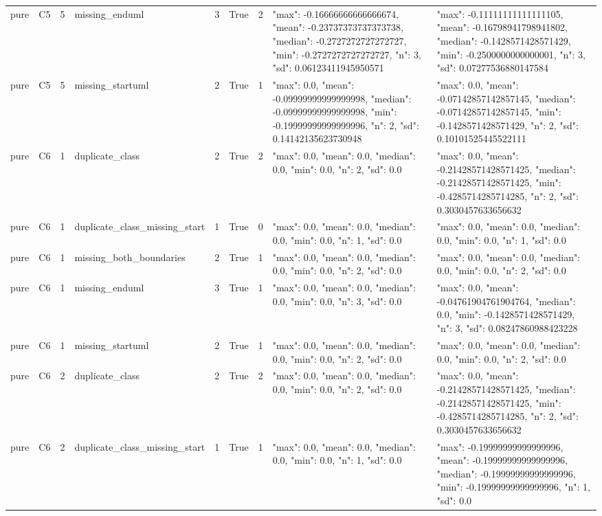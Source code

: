 \begin{tabular}{lllllllll}
pure & C5 & 5 & missing\_enduml & 3 & True & 2 & {"max": -0.16666666666666674, "mean": -0.23737373737373738, "median": -0.2727272727272727, "min": -0.2727272727272727, "n": 3, "sd": 0.06123411945950571} & {"max": -0.11111111111111105, "mean": -0.16798941798941802, "median": -0.1428571428571429, "min": -0.2500000000000001, "n": 3, "sd": 0.07277536880147584} \\
pure & C5 & 5 & missing\_startuml & 2 & True & 1 & {"max": 0.0, "mean": -0.09999999999999998, "median": -0.09999999999999998, "min": -0.19999999999999996, "n": 2, "sd": 0.14142135623730948} & {"max": 0.0, "mean": -0.07142857142857145, "median": -0.07142857142857145, "min": -0.1428571428571429, "n": 2, "sd": 0.10101525445522111} \\
pure & C6 & 1 & duplicate\_class & 2 & True & 2 & {"max": 0.0, "mean": 0.0, "median": 0.0, "min": 0.0, "n": 2, "sd": 0.0} & {"max": 0.0, "mean": -0.21428571428571425, "median": -0.21428571428571425, "min": -0.4285714285714285, "n": 2, "sd": 0.3030457633656632} \\
pure & C6 & 1 & duplicate\_class\_missing\_start & 1 & True & 0 & {"max": 0.0, "mean": 0.0, "median": 0.0, "min": 0.0, "n": 1, "sd": 0.0} & {"max": 0.0, "mean": 0.0, "median": 0.0, "min": 0.0, "n": 1, "sd": 0.0} \\
pure & C6 & 1 & missing\_both\_boundaries & 2 & True & 1 & {"max": 0.0, "mean": 0.0, "median": 0.0, "min": 0.0, "n": 2, "sd": 0.0} & {"max": 0.0, "mean": 0.0, "median": 0.0, "min": 0.0, "n": 2, "sd": 0.0} \\
pure & C6 & 1 & missing\_enduml & 3 & True & 1 & {"max": 0.0, "mean": 0.0, "median": 0.0, "min": 0.0, "n": 3, "sd": 0.0} & {"max": 0.0, "mean": -0.04761904761904764, "median": 0.0, "min": -0.1428571428571429, "n": 3, "sd": 0.08247860988423228} \\
pure & C6 & 1 & missing\_startuml & 2 & True & 1 & {"max": 0.0, "mean": 0.0, "median": 0.0, "min": 0.0, "n": 2, "sd": 0.0} & {"max": 0.0, "mean": 0.0, "median": 0.0, "min": 0.0, "n": 2, "sd": 0.0} \\
pure & C6 & 2 & duplicate\_class & 2 & True & 2 & {"max": 0.0, "mean": 0.0, "median": 0.0, "min": 0.0, "n": 2, "sd": 0.0} & {"max": 0.0, "mean": -0.21428571428571425, "median": -0.21428571428571425, "min": -0.4285714285714285, "n": 2, "sd": 0.3030457633656632} \\
pure & C6 & 2 & duplicate\_class\_missing\_start & 1 & True & 1 & {"max": 0.0, "mean": 0.0, "median": 0.0, "min": 0.0, "n": 1, "sd": 0.0} & {"max": -0.19999999999999996, "mean": -0.19999999999999996, "median": -0.19999999999999996, "min": -0.19999999999999996, "n": 1, "sd": 0.0} \\

\end{tabular}
